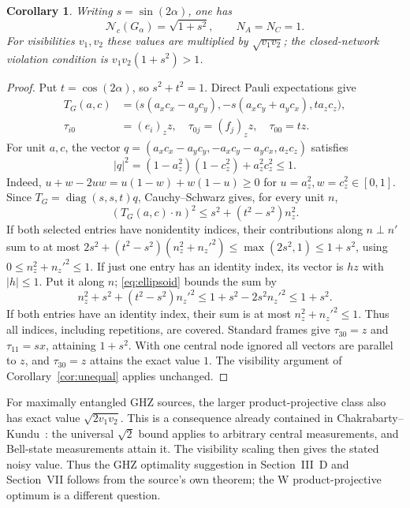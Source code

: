 \documentclass[11pt,a4paper]{article}
\newtheorem{corollary}[theorem]{Corollary}
\begin{document}
\begin{corollary}\label{cor:ghz}
Writing $s=\sin(2\alpha)$, one has
\[
 \mathcal N_c(G_\alpha)=\sqrt{1+s^2},\qquad N_A=N_C=1.
\]
For visibilities $v_1,v_2$ these values are multiplied by
$\sqrt{v_1v_2}$; the closed-network violation condition is
$v_1v_2(1+s^2)>1$.
\end{corollary}
\begin{proof}
Put $t=\cos(2\alpha)$, so $s^2+t^2=1$. Direct Pauli expectations give
\begin{align*}
 T_G(a,c)&=\bigl(s(a_xc_x-a_yc_y),-s(a_xc_y+a_yc_x),t a_zc_z\bigr),\\
 \tau_{i0}&=(e_i)_z z,\quad \tau_{0j}=(f_j)_z z,\quad \tau_{00}=t z.
\end{align*}
For unit $a,c$, the vector
$q=(a_xc_x-a_yc_y,-a_xc_y-a_yc_x,a_zc_z)$ satisfies
\[
 |q|^2=(1-a_z^2)(1-c_z^2)+a_z^2c_z^2\leq1.
\]
Indeed, $u+w-2uw=u(1-w)+w(1-u)\geq0$ for
$u=a_z^2,w=c_z^2\in[0,1]$. Since $T_G=\operatorname{diag}(s,s,t)q$,
Cauchy--Schwarz gives, for every unit $n$,
\begin{equation}\label{eq:ellipsoid}
 (T_G(a,c)\cdot n)^2\leq s^2+(t^2-s^2)n_z^2.
\end{equation}
If both selected entries have nonidentity indices, their contributions
along $n\perp n'$ sum to at most
$2s^2+(t^2-s^2)(n_z^2+n_z'^2)\leq\max(2s^2,1)\leq1+s^2$,
using $0\leq n_z^2+n_z'^2\leq1$. If just one entry has an identity
index, its vector is $h z$ with $|h|\leq1$. Put it along $n$;
\eqref{eq:ellipsoid} bounds the sum by
\[
 n_z^2+s^2+(t^2-s^2)n_z'^2
 \leq1+s^2-2s^2 n_z'^2\leq1+s^2.
\]
If both entries have an identity index, their sum is at most
$n_z^2+n_z'^2\leq1$. Thus all indices, including repetitions,
are covered. Standard frames give $\tau_{30}=z$ and $\tau_{11}=s x$,
attaining $1+s^2$. With one central node ignored all vectors are
parallel to $z$, and $\tau_{30}=z$ attains the exact value $1$.
The visibility argument of Corollary~\ref{cor:unequal} applies unchanged.
\end{proof}

For maximally entangled GHZ sources, the larger product-projective class
also has exact value $\sqrt{2v_1v_2}$. This is a consequence already
contained in Chakrabarty--Kundu~\cite[Theorem~4(i), $n=2$; Eq.~(14)]{CK}:
the universal $\sqrt2$ bound applies to arbitrary central measurements,
and Bell-state measurements attain it. The visibility scaling then gives
the stated noisy value. Thus the GHZ optimality suggestion in
Section~III~D and Section~VII follows from the source's own theorem;
the W product-projective optimum is a different question.
\end{document}

